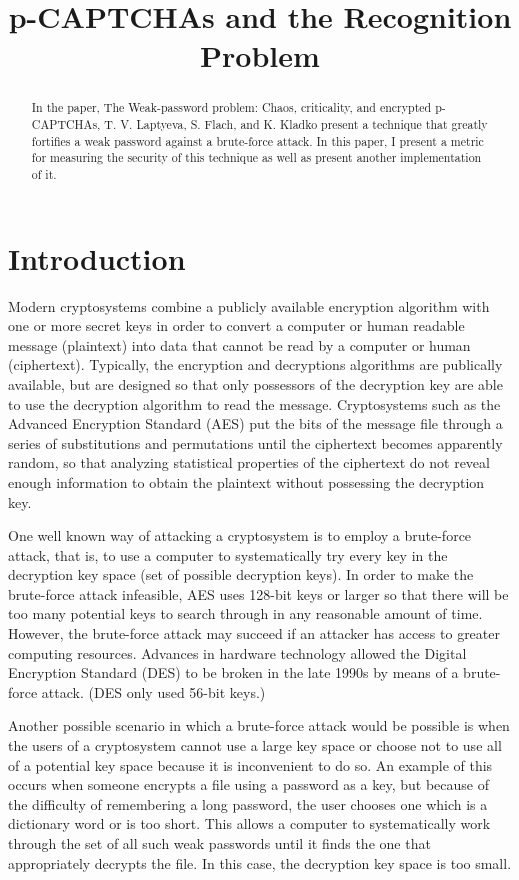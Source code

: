 \documentclass[12pt]{article}
\begin{document}
\title{p-CAPTCHAs and the Recognition Problem}
\maketitle

\begin{abstract}
In the paper, The Weak-password problem: Chaos, criticality, and encrypted p-CAPTCHAs, T. V. Laptyeva, S. Flach, and K. Kladko present a technique that greatly fortifies a weak password against a brute-force attack. In this paper, I present a metric for measuring the security of this technique as well as present another implementation of it.
\end{abstract}

\section*{Introduction}
Modern cryptosystems combine a publicly available encryption algorithm with one or more secret keys in order to convert a computer or human readable message (plaintext) into data that cannot be read by a computer or human (ciphertext). Typically, the encryption and decryptions algorithms are publically available, but are designed so that only possessors of the decryption key are able to use the decryption algorithm to read the message. Cryptosystems such as the Advanced Encryption Standard (AES) put the bits of the message file through a series of substitutions and permutations until the ciphertext becomes apparently random, so that analyzing statistical properties of the ciphertext do not reveal enough information to obtain the plaintext without possessing the decryption key.

One well known way of attacking a cryptosystem is to employ a brute-force attack, that is, to use a computer to systematically try every key in the decryption key space (set of possible decryption keys). In order to make the brute-force attack infeasible, AES uses 128-bit keys or larger so that there will be too many potential keys to search through in any reasonable amount of time. However, the brute-force attack may succeed if an attacker has access to greater computing resources. Advances in hardware technology allowed the Digital Encryption Standard (DES) to be broken in the late 1990s by means of a brute-force attack. (DES only used 56-bit keys.)

Another possible scenario in which a brute-force attack would be possible is when the users of a cryptosystem cannot use a large key space or choose not to use all of a potential key space because it is inconvenient to do so. An example of this occurs when someone encrypts a file using a password as a key, but because of the difficulty of remembering a long password, the user chooses one which is a dictionary word or is too short. This allows a computer to systematically work through the set of all such weak passwords until it finds the one that appropriately decrypts the file. In this case, the decryption key space is too small.
\end{document}
